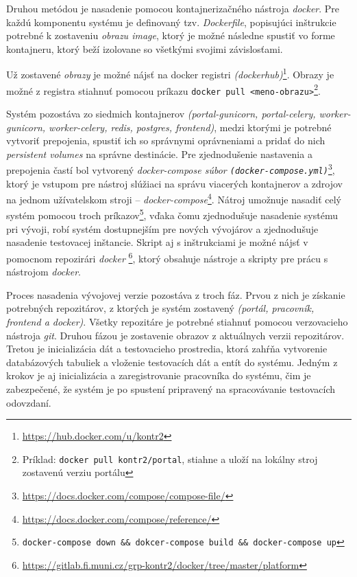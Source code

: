 \documentclass[
  digital, %
  twoside, %
  table,   %
  lof,     %
  lot,     %
]{fithesis3}
\begin{document}
Druhou metódou je nasadenie pomocou kontajnerizačného nástroja \emph{docker}. Pre každú komponentu systému je definovaný tzv. \emph{Dockerfile}, popisujúci inštrukcie potrebné k zostaveniu \emph{obrazu \emph{image}}, ktorý je možné následne spustiť vo forme kontajneru, ktorý beží izolovane so všetkými svojimi závislosťami.

Už zostavené \emph{obrazy} je možné nájsť na docker registri \emph{(dockerhub)}\footnote{\url{https://hub.docker.com/u/kontr2}}. Obrazy je možné z registra stiahnuť pomocou príkazu \texttt{docker pull <meno-obrazu>}\footnote{Príklad: \texttt{docker pull kontr2/portal}, stiahne a uloží na lokálny stroj zostavenú verziu portálu}.

Systém pozostáva zo siedmich kontajnerov \emph{(portal-gunicorn, portal-celery, worker-gunicorn, worker-celery, redis, postgres, frontend)}, medzi ktorými je potrebné vytvoriť prepojenia, spustiť ich so správnymi oprávneniami a pridať do nich \emph{persistent volumes} na správne destinácie. Pre zjednodušenie nastavenia a prepojenia častí bol vytvorený \emph{docker-compose súbor \texttt{(docker-compose.yml)}}\footnote{\url{https://docs.docker.com/compose/compose-file/}}, ktorý je vstupom pre nástroj slúžiaci na správu viacerých kontajnerov a zdrojov na jednom užívatelskom stroji -- \emph{docker-compose}\footnote{\url{https://docs.docker.com/compose/reference/}}. Nátroj umožnuje nasadiť celý systém pomocou troch príkazov\footnote{\texttt{docker-compose down \&\& dokcer-compose build \&\& docker-compose up}}, vďaka čomu zjednodušuje nasadenie systému pri vývoji, robí systém dostupnejším pre nových vývojárov a zjednodušuje nasadenie testovacej inštancie. Skript aj s inštrukciami je možné nájsť v pomocnom repozirári \emph{docker} \footnote{\url{https://gitlab.fi.muni.cz/grp-kontr2/docker/tree/master/platform}}, ktorý obsahuje nástroje a skripty pre prácu s nástrojom \emph{docker}.

Proces nasadenia vývojovej verzie pozostáva z troch fáz. Prvou z nich je získanie potrebných repozitárov, z ktorých je systém zostavený \emph{(portál, pracovník, frontend a docker)}. Všetky repozitáre je potrebné stiahnuť pomocou verzovacieho nástroja \emph{git}. Druhou fázou je zostavenie obrazov z aktuálnych verzii repozitárov. Tretou je inicializácia dát a testovacieho prostredia, ktorá zahŕňa vytvorenie databázových tabuliek a vloženie testovacích dát a entít do systému. Jedným z krokov je aj inicializácia a zaregistrovanie pracovníka do systému, čim je zabezpečené, že systém je po spustení pripravený na spracovávanie testovacích odovzdaní.
\end{document}
